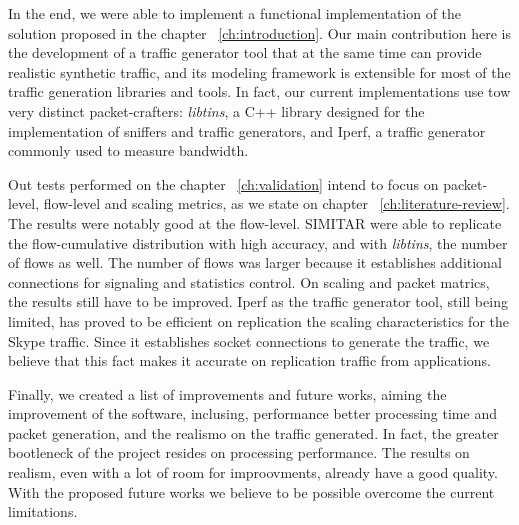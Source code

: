 In the end, we were able to implement a functional implementation of the solution proposed in the chapter ~\ref{ch:introduction}. Our main contribution here is the development of a traffic generator tool that at the same time can provide realistic synthetic traffic, and its modeling framework is extensible for most of the traffic generation libraries and tools. In fact, our current implementations use tow very distinct packet-crafters: \textit{libtins}, a C++ library designed for the implementation of sniffers and traffic generators, and Iperf, a traffic generator commonly used to measure bandwidth. 


Out tests performed on the chapter ~\ref{ch:validation} intend to focus on packet-level, flow-level and scaling metrics, as we state on chapter ~\ref{ch:literature-review}. The results were notably good at the flow-level. SIMITAR were able to replicate the flow-cumulative distribution with high accuracy, and with \textit{libtins}, the number of flows as well. The number of flows was larger because it establishes additional connections for signaling and statistics control. On scaling and packet matrics, the results still have to be improved. Iperf as the traffic generator tool, still being limited, has proved to be efficient on replication the scaling characteristics for the Skype traffic. Since it establishes socket connections to generate the traffic, we believe that this fact makes it accurate on replication traffic from applications. 


Finally, we created a list of improvements and future works, aiming the improvement of the software, inclusing, performance better processing time and packet generation, and the realismo on the traffic generated. In fact, the greater bootleneck of the project resides on processing performance. The results on realism, even with a lot of room for improovments, already have a good quality. With the proposed future works we believe to be possible overcome the current limitations.


